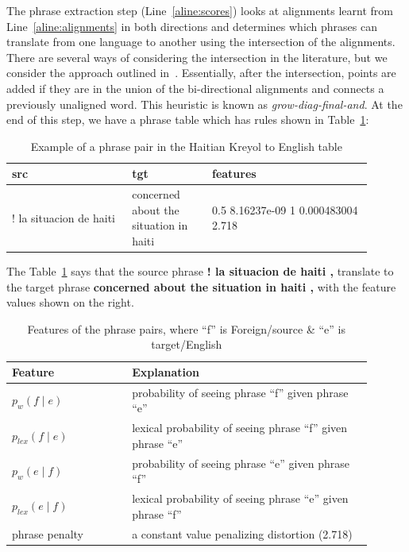 The phrase extraction step (Line~\ref{aline:scores}) looks at alignments learnt from Line~\ref{aline:alignments} in both directions and determines which phrases can translate from one language to another using the intersection of the alignments. There are several ways of considering the intersection in the literature, but we consider the approach outlined in~\cite{Koehn:03}. Essentially, after the intersection, points are added if they are in the union of the bi-directional alignments and connects a previously unaligned word. This heuristic is known as \emph{grow-diag-final-and}. At the end of this step, we have a phrase table which has rules shown in Table~\ref{table:example_rule}: 

\begin{table}[ht]
\small
\small
\centering
\begin{tabular}{p{0.3\linewidth}p{0.2\linewidth}p{0.4\linewidth}}
\toprule
src & tgt & features \\
\toprule
! la situacion de haiti & concerned about the situation in haiti & 0.5 8.16237e-09 1 0.000483004 2.718 \\
\bottomrule
\end{tabular}
\caption{Example of a phrase pair in the Haitian Kreyol to English table}
\label{table:example_rule}
\end{table}


The Table~\ref{table:example_rule}  says that the source phrase \textbf{! la situacion de haiti ,} translate to the target phrase \textbf{concerned about the situation in haiti ,} with the feature values shown on the right. 

\begin{table}
	\small
	\small
	\begin{tabular}{p{0.3\linewidth}p{0.6\linewidth}}
	\toprule
	Feature &  Explanation \\
	\toprule
	$p_{w}(f \mid e)$ & probability of seeing phrase ``f'' given phrase ``e'' \\
	$p_{lex}(f \mid e)$ & lexical probability of seeing phrase ``f'' given phrase ``e'' \\
	$p_{w}(e \mid f)$ & probability of seeing phrase ``e'' given phrase ``f'' \\
	$p_{lex}(e \mid f)$ & lexical probability of seeing phrase ``e'' given phrase ``f'' \\
   	phrase penalty & a constant value penalizing distortion (2.718)\\
	\bottomrule
	\end{tabular}
	\caption{Features of the phrase pairs, where ``f'' is Foreign/source \& ``e'' is target/English}
	\label{table:features}
\end{table}

